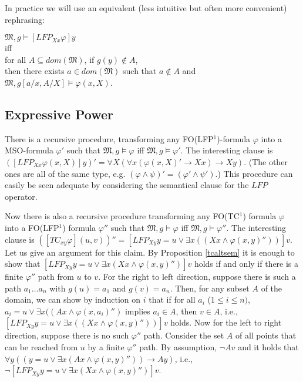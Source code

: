 \documentclass{LMCS}
\newcommand{\frM}{\mathfrak{M}}
\newcommand{\mso}{\textsf{MSO}\xspace}
\newcommand{\fotc}{\textsf{FO(TC$^1$)}\xspace}
\newcommand{\folfp}{\textsf{FO(LFP$^1$)}\xspace}
\begin{document}
\begin{rem}
In practice we will use an equivalent (less intuitive but often
more convenient) rephrasing:
\begin{center}
$\frM, g \models [LFP_{Xx}\varphi]y$\\
iff\\
for all $A \subseteq dom(\frM)$, if $g(y) \notin A$,\\
then there exists $a \in dom(\frM)$ such that $a \notin A$ and $\frM, g[a/x,A/X] \models \varphi(x,X)$.
\end{center}
\end{rem}

\subsection{Expressive Power}
\label{exppow}


There is a recursive procedure, transforming any \folfp-formula
$\varphi$ into a \mso-formula $\varphi'$ such that $\frM, g \models
\varphi$ iff $\frM, g \models \varphi'$. The interesting clause is
$([LFP_{Xx}\varphi(x,X)]y)'=\forall X (\forall x (\varphi(x,X)'
\rightarrow Xx) \rightarrow Xy)$. (The other ones are all of the same type, e.g. $(\varphi \wedge \psi)'=(\varphi' \wedge \psi')$.) This procedure can easily be seen adequate by considering the semantical clause for the $LFP$ operator.

Now there is also a recursive procedure transforming any \fotc formula
$\varphi$ into a \folfp formula $\varphi''$ such that $\frM, g \models
\varphi$ iff $\frM, g \models \varphi''$. The interesting clause is
$([TC_{xy} \varphi](u,v))''=[LFP_{Xy} y=u \vee \exists x((Xx \wedge \varphi(x,y)''))]v$.
Let us give an argument for this claim. By Proposition \ref{tcaltsem} it is
enough to show that $[LFP_{Xy} y=u \vee \exists x(Xx \wedge
\varphi(x,y)'')]v$ holds if and only if there is a finite
$\varphi''$ path from $u$ to $v$. For the right to left direction,
suppose there is such a path $a_1 \ldots a_n$ with $g(u)=a_1$ and
$g(v)=a_n$. Then, for any subset $A$ of the domain, we can show by
induction on $i$ that if for all $a_i$ ($1 \leq i \leq n)$, $a_i=u
\vee \exists x((Ax \wedge \varphi(x,a_i)'')$ implies $a_i \in A$,
then $v \in A$, i.e., $[LFP_{Xy} y=u \vee \exists x((Xx \wedge
\varphi(x,y)''))]v$ holds. Now for the left to right direction,
suppose there is no such $\varphi''$ path. Consider the set $A$ of
all points that can be reached from $u$ by a finite $\varphi''$
path. By assumption, $\neg Av$ and it holds that $\forall y ((y=u
\vee \exists x(Ax \wedge \varphi(x,y)''))\rightarrow Ay)$, i.e.,
$\neg[LFP_{Xy} y=u \vee \exists x(Xx \wedge \varphi(x,y)'')]v$.
\end{document}
